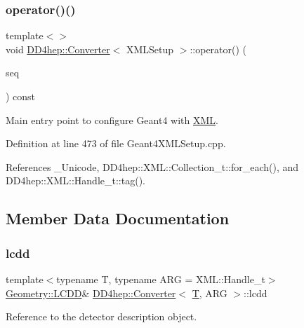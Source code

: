 \subsubsection{\texorpdfstring{operator()()}{operator()()}\hspace{0.1cm}{\footnotesize\ttfamily [22/22]}}
{\footnotesize\ttfamily template$<$$>$ \\
void \hyperlink{struct_d_d4hep_1_1_converter}{D\+D4hep\+::\+Converter}$<$ X\+M\+L\+Setup $>$\+::operator() (\begin{DoxyParamCaption}\item[{\hyperlink{_det_factory_helper_8h_ac13b3c79d2bc9214ff0cf5b8dc43dda6}{xml\+\_\+h}}]{seq }\end{DoxyParamCaption}) const}



Main entry point to configure Geant4 with \hyperlink{namespace_d_d4hep_1_1_x_m_l}{X\+ML}. 



Definition at line 473 of file Geant4\+X\+M\+L\+Setup.\+cpp.



References \+\_\+\+Unicode, D\+D4hep\+::\+X\+M\+L\+::\+Collection\+\_\+t\+::for\+\_\+each(), and D\+D4hep\+::\+X\+M\+L\+::\+Handle\+\_\+t\+::tag().



\subsection{Member Data Documentation}
\hypertarget{struct_d_d4hep_1_1_converter_acefaa7bdcbf210e64d96db04f90b5c9c}{}\label{struct_d_d4hep_1_1_converter_acefaa7bdcbf210e64d96db04f90b5c9c} 
\subsubsection{\texorpdfstring{lcdd}{lcdd}}
{\footnotesize\ttfamily template$<$typename T, typename A\+RG = X\+M\+L\+::\+Handle\+\_\+t$>$ \\
\hyperlink{class_d_d4hep_1_1_geometry_1_1_l_c_d_d}{Geometry\+::\+L\+C\+DD}\& \hyperlink{struct_d_d4hep_1_1_converter}{D\+D4hep\+::\+Converter}$<$ \hyperlink{class_t}{T}, A\+RG $>$\+::lcdd}



Reference to the detector description object. 



